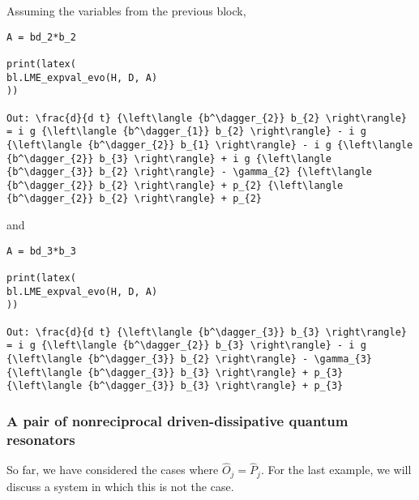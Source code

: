 \documentclass[5p, twocolumn, 10pt, sort&compress]{elsarticle}
\begin{document}
Assuming the variables from the previous block,
\begin{verbatim}
A = bd_2*b_2

print(latex(
bl.LME_expval_evo(H, D, A)
))

Out: \frac{d}{d t} {\left\langle {b^\dagger_{2}} b_{2} \right\rangle} = i g {\left\langle {b^\dagger_{1}} b_{2} \right\rangle} - i g {\left\langle {b^\dagger_{2}} b_{1} \right\rangle} - i g {\left\langle {b^\dagger_{2}} b_{3} \right\rangle} + i g {\left\langle {b^\dagger_{3}} b_{2} \right\rangle} - \gamma_{2} {\left\langle {b^\dagger_{2}} b_{2} \right\rangle} + p_{2} {\left\langle {b^\dagger_{2}} b_{2} \right\rangle} + p_{2}
\end{verbatim}
and
\begin{verbatim}
A = bd_3*b_3

print(latex(
bl.LME_expval_evo(H, D, A)
))

Out: \frac{d}{d t} {\left\langle {b^\dagger_{3}} b_{3} \right\rangle} = i g {\left\langle {b^\dagger_{2}} b_{3} \right\rangle} - i g {\left\langle {b^\dagger_{3}} b_{2} \right\rangle} - \gamma_{3} {\left\langle {b^\dagger_{3}} b_{3} \right\rangle} + p_{3} {\left\langle {b^\dagger_{3}} b_{3} \right\rangle} + p_{3}
\end{verbatim}

\subsubsection{A pair of nonreciprocal driven-dissipative quantum resonators}

So far, we have considered the cases where $\hat{O}_j=\hat{P}_j$.  For the last example, we will discuss a system in which this is not the case. 
\end{document}
